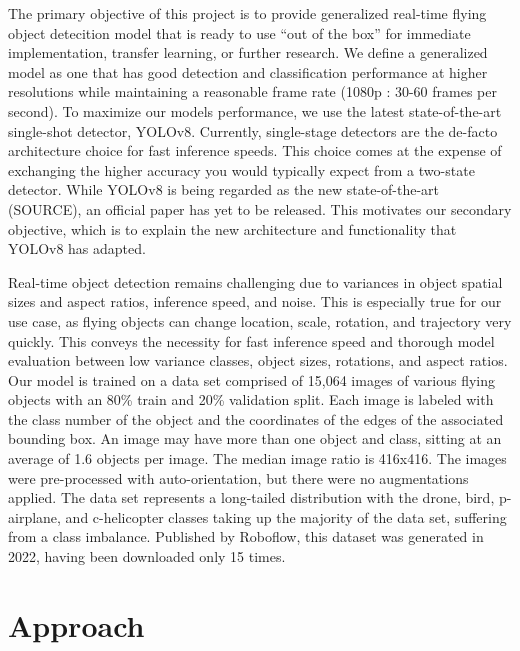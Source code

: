 \documentclass[10pt,twocolumn,letterpaper]{article}
\begin{document}
The primary objective of this project is to provide generalized real-time flying object detecition model that is ready to use ``out of the box'' for immediate implementation, transfer learning, or further research. We define a generalized model as one that has good detection and classification performance at higher resolutions while maintaining a reasonable frame rate (1080p : 30-60 frames per second). To maximize our models performance, we use the latest state-of-the-art single-shot detector, YOLOv8. Currently, single-stage detectors are the de-facto architecture choice for fast inference speeds. This choice comes at the expense of exchanging the higher accuracy you would typically expect from a two-state detector. While YOLOv8 is being regarded as the new state-of-the-art (SOURCE), an official paper has yet to be released. This motivates our secondary objective, which is to explain the new architecture and functionality that YOLOv8 has adapted. 

Real-time object detection remains challenging due to variances in object spatial sizes and aspect ratios, inference speed, and noise. This is especially true for our use case, as flying objects can change location, scale, rotation, and trajectory very quickly. This conveys the necessity for fast inference speed and thorough model evaluation between low variance classes, object sizes, rotations, and aspect ratios.
\\
Our model is trained on a data set comprised of 15,064 images of various flying objects with an 80\% train and 20\% validation split. Each image is labeled with the class number of the object and the coordinates of the edges of the associated bounding box. An image may have more than one object and class, sitting at an average of 1.6 objects per image. The median image ratio is 416x416. The images were pre-processed with auto-orientation, but there were no augmentations applied. The data set represents a long-tailed distribution with the drone, bird, p-airplane, and c-helicopter classes taking up the majority of the data set, suffering from a class imbalance. Published by Roboflow, this dataset was generated in 2022, having been downloaded only 15 times.
\section{Approach}
\end{document}
